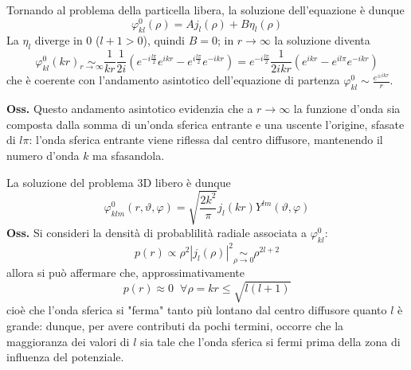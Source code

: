 Tornando al problema della particella libera, la soluzione dell'equazione è dunque
$$\varphi^0_{kl}(\rho) = Aj_l(\rho)+B\eta_l(\rho)$$
La $\eta_l$ diverge in 0 ($l+1>0$), quindi $B=0$; in $r\to\infty$ la soluzione diventa
$$\varphi^0_{kl}(kr) \underset{r\to\infty}\sim\frac{1}{kr}\frac{1}{2i}
\left(e^{-i\frac{l\pi}{2}}e^{ikr}-e^{i\frac{l\pi}{2}}e^{-ikr}\right) =
e^{-i\frac{l\pi}{2}}\frac{1}{2ikr}\left(e^{ikr}-e^{il\pi}e^{-ikr}\right)$$
che è coerente con l'andamento asintotico dell'equazione di partenza
$\varphi^0_{kl}\sim\frac{e^{\pm ikr}}{r}$.

\textbf{Oss.} Questo andamento asintotico evidenzia che a $r\to\infty$ la funzione d'onda sia
composta dalla somma di un'onda sferica entrante e una uscente l'origine, sfasate di $l\pi$: l'onda
sferica entrante viene riflessa dal centro diffusore, mantenendo il numero d'onda $k$ ma sfasandola.

La soluzione del problema 3D libero è dunque
$$\varphi^0_{klm}(r,\vartheta,\varphi) = \sqrt{\frac{2k^2}{\pi}}j_l(kr)Y^{lm}(\vartheta,\varphi)$$
\textbf{Oss.} Si consideri la densità di probablilità radiale associata a $\varphi^0_{kl}$:
$$p(r)\propto\rho^2|j_l(\rho)|^2\underset{\rho\to0}\sim\rho^{2l+2}$$
allora si può affermare che, approssimativamente
$$p(r)\approx 0\phantom{x} \forall\rho=kr\leq\sqrt{l(l+1)}$$
cioè che l'onda sferica si "ferma" tanto più lontano dal centro diffusore quanto $l$ è grande:
dunque, per avere contributi da pochi termini, occorre che la maggioranza dei valori di $l$ sia
tale che l'onda sferica si fermi prima della zona di influenza del potenziale.
